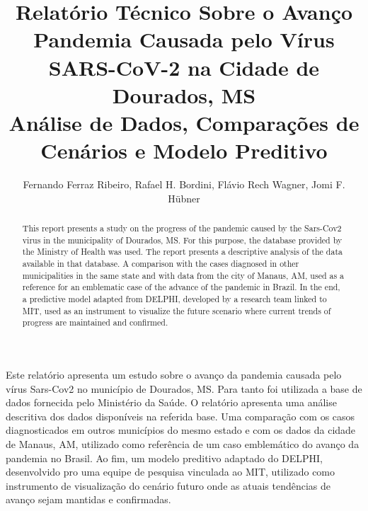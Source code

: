 \documentclass[12pt]{article}
\begin{document}
 


\title{Relatório Técnico Sobre o Avanço Pandemia Causada pelo Vírus SARS-CoV-2 na Cidade de Dourados, MS\\ Análise de Dados, Comparações de Cenários e Modelo Preditivo}

\author{Fernando Ferraz Ribeiro, Rafael H. Bordini, Flávio Rech
  Wagner, Jomi F. Hübner }
  


\address{Universidade Federal da Bahia -- Faculdade de Arquitetura -- LCAD
  (UFBA)\\
  Salvador, BA -- Brasil
\nextinstitute
  Department of Computer Science -- University of Durham\\
  Durham, U.K.
\nextinstitute
  Departamento de Sistemas e Computação\\
  Universidade Regional de Blumenal (FURB) -- Blumenau, SC -- Brazil
}


\maketitle

\begin{abstract}
  This report presents a study on the progress of the pandemic caused by the Sars-Cov2 virus in the municipality of Dourados, MS. For this purpose, the database provided by the Ministry of Health was used. The report presents a descriptive analysis of the data available in that database. A comparison with the cases diagnosed in other municipalities in the same state and with data from the city of Manaus, AM, used as a reference for an emblematic case of the advance of the pandemic in Brazil. In the end, a predictive model adapted from DELPHI, developed by a research team linked to MIT, used as an instrument to visualize the future scenario where current trends of progress are maintained and confirmed.
\end{abstract}
     
\begin{resumo} 
  Este relatório apresenta um estudo sobre o avanço da pandemia causada pelo vírus Sars-Cov2 no município de Dourados, MS. Para tanto foi utilizada a base de dados fornecida pelo Ministério da Saúde. O relatório apresenta uma análise descritiva dos dados disponíveis na referida base. Uma comparação com os casos diagnosticados em outros municípios do mesmo estado e com os dados da cidade de Manaus, AM, utilizado como referência de um caso emblemático do avanço da pandemia no Brasil. Ao fim, um modelo preditivo adaptado do DELPHI, desenvolvido pro uma equipe de pesquisa vinculada ao MIT, utilizado como instrumento de visualização do cenário futuro onde as atuais tendências de avanço sejam mantidas e confirmadas.
\end{resumo}
\end{document}
